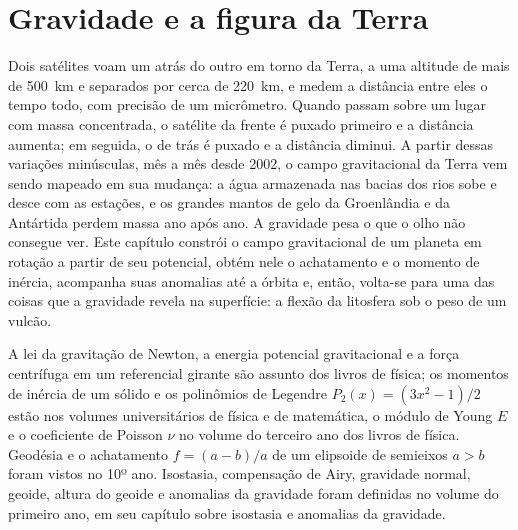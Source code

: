 \chapter{Gravidade e a figura da Terra}\label{ch:b3:gravity-geodesy}

Dois satélites voam um atrás do outro em torno da Terra, a uma altitude de mais de
\qty{500}{km} e separados por cerca de \qty{220}{km}, e medem a distância entre
eles o tempo todo, com precisão de um micrômetro.
Quando passam sobre um lugar com massa concentrada, o satélite da frente é
puxado primeiro e a distância aumenta; em seguida, o de trás é puxado e a
distância diminui. A partir dessas variações minúsculas, mês a mês desde 2002, o
campo gravitacional da Terra vem sendo mapeado em sua mudança: a água armazenada
nas bacias dos rios sobe e desce com as estações, e os grandes mantos de gelo da
Groenlândia e da Antártida perdem massa ano após ano. A gravidade pesa o que o
olho não consegue ver. Este capítulo constrói o campo gravitacional de um planeta em rotação a partir de seu
potencial, obtém nele o achatamento e o momento de inércia, acompanha suas
anomalias até a órbita e, então, volta-se para uma das coisas que a gravidade revela na
superfície: a flexão da litosfera sob o peso de um vulcão.

\begin{recall}
A lei da gravitação de Newton, a energia potencial gravitacional e a força
centrífuga em um referencial girante são assunto dos livros de física; os momentos
de inércia de um sólido e os polinômios de Legendre $P_2(x) = (3x^2 - 1)/2$ estão
nos volumes universitários de física e de matemática, o módulo de Young $E$ e o
coeficiente de Poisson $\nu$ no volume do terceiro ano dos livros de física. Geodésia e o achatamento $f = (a - b)/a$ de um elipsoide de semieixos $a > b$
foram vistos no 10º ano. Isostasia, compensação de Airy,
gravidade normal, geoide, altura do geoide e anomalias da gravidade foram
definidas no volume do primeiro ano, em seu capítulo sobre isostasia e anomalias
da gravidade.
\end{recall}

